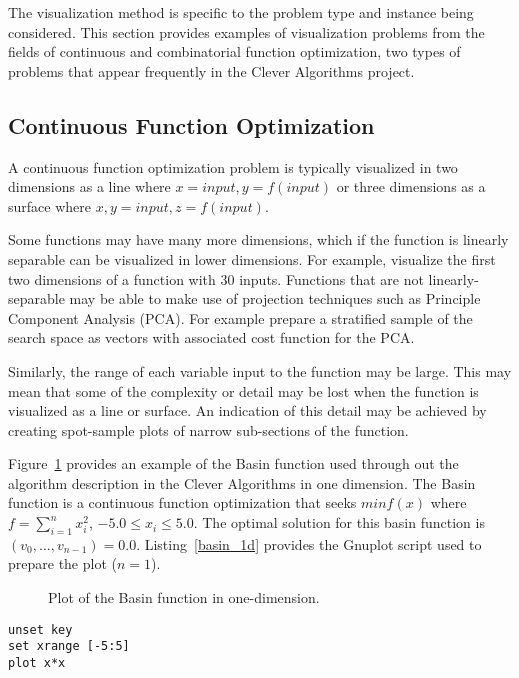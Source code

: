 \documentclass[a4paper, 11pt]{article}
\begin{document}
The visualization method is specific to the problem type and instance being considered. 
This section provides examples of visualization problems from the fields of continuous and combinatorial function optimization, two types of problems that appear frequently in the Clever Algorithms project.

\subsection{Continuous Function Optimization}
A continuous function optimization problem is typically visualized in two dimensions as a line where $x=input, y=f(input)$ or three dimensions as a surface where $x,y=input, z=f(input)$. 

Some functions may have many more dimensions, which if the function is linearly separable can be visualized in lower dimensions. For example, visualize the first two dimensions of a function with 30 inputs. Functions that are not linearly-separable may be able to make use of projection techniques such as Principle Component Analysis (PCA). For example prepare a stratified sample of the search space as vectors with associated cost function for the PCA.

Similarly, the range of each variable input to the function may be large. This may mean that some of the complexity or detail may be lost when the function is visualized as a line or surface. An indication of this detail may be achieved by creating spot-sample plots of narrow sub-sections of the function. 

Figure~\ref{plot:basin1} provides an example of the Basin function used through out the algorithm description in the Clever Algorithms in one dimension. The Basin function is a  continuous function optimization that seeks $min f(x)$ where $f=\sum_{i=1}^n x_{i}^2$, $-5.0\leq x_i \leq 5.0$. The optimal solution for this basin function is $(v_0,\ldots,v_{n-1})=0.0$. Listing~\ref{basin_1d} provides the Gnuplot script used to prepare the plot ($n=1$).

\begin{figure}[htp]

\caption{Plot of the Basin function in one-dimension.}
\label{plot:basin1}
\end{figure}

\begin{lstlisting}[caption=Gnuplot script for plotting the Basin function in one-dimension., label=basin_1d]
unset key
set xrange [-5:5]
plot x*x
\end{lstlisting}
\end{document}
